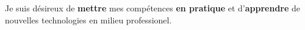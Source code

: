 %
%
%
\par{
Je suis désireux de \textbf{mettre} mes compétences \textbf{en pratique} et d'\textbf{apprendre} de nouvelles technologies en milieu professionel.
}